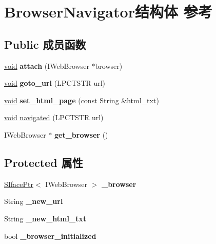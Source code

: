 \hypertarget{struct_browser_navigator}{}\section{Browser\+Navigator结构体 参考}
\label{struct_browser_navigator}
\subsection*{Public 成员函数}
\begin{DoxyCompactItemize}
\item 
\mbox{\label{struct_browser_navigator_abd6bd3f8878263c1003ea683d9e9798b}} 
\hyperlink{interfacevoid}{void} {\bfseries attach} (I\+Web\+Browser $\ast$browser)
\item 
\mbox{\label{struct_browser_navigator_a5686d61710023377c1cc1f46bff14ac1}} 
\hyperlink{interfacevoid}{void} {\bfseries goto\+\_\+url} (L\+P\+C\+T\+S\+TR url)
\item 
\mbox{\label{struct_browser_navigator_a14992e0160c41fe246493c743f4564a9}} 
\hyperlink{interfacevoid}{void} {\bfseries set\+\_\+html\+\_\+page} (const String \&html\+\_\+txt)
\item 
\hyperlink{interfacevoid}{void} \hyperlink{struct_browser_navigator_ad6dc6468c14e4c4979361686e0e156db}{navigated} (L\+P\+C\+T\+S\+TR url)
\item 
\mbox{\label{struct_browser_navigator_a6aa5ccdfbd8cbf71b151b602c2b2c9de}} 
I\+Web\+Browser $\ast$ {\bfseries get\+\_\+browser} ()
\end{DoxyCompactItemize}
\subsection*{Protected 属性}
\begin{DoxyCompactItemize}
\item 
\mbox{\label{struct_browser_navigator_a60cba175a061cfd2b6a24c5ee651c447}} 
\hyperlink{struct_s_iface_ptr}{S\+Iface\+Ptr}$<$ I\+Web\+Browser $>$ {\bfseries \+\_\+browser}
\item 
\mbox{\label{struct_browser_navigator_a924e688cfddf7e6ca6a790426559387f}} 
String {\bfseries \+\_\+new\+\_\+url}
\item 
\mbox{\label{struct_browser_navigator_af6a98416bb4544cedd1ad276e7491c96}} 
String {\bfseries \+\_\+new\+\_\+html\+\_\+txt}
\item 
\mbox{\label{struct_browser_navigator_ad3d552a97cb5c99b5047c801adbc22ca}} 
bool {\bfseries \+\_\+browser\+\_\+initialized}
\end{DoxyCompactItemize}


